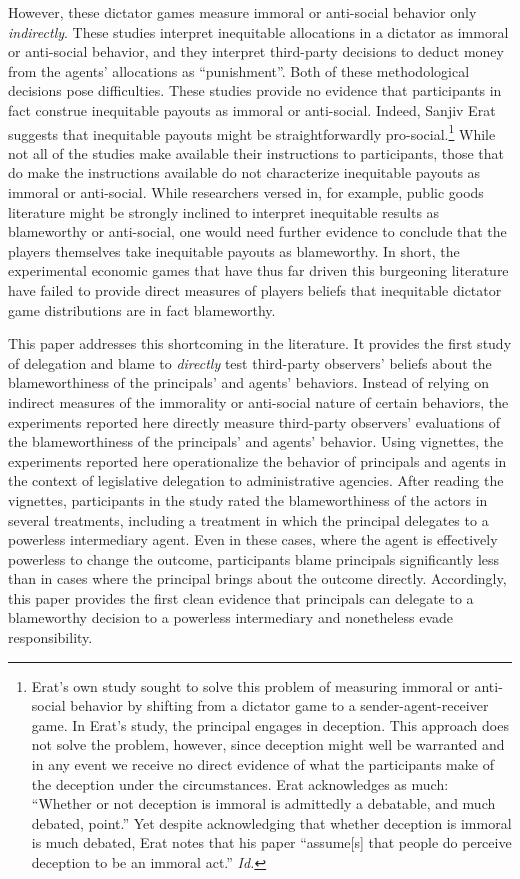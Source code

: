 \documentclass{article}
\begin{document}
However, these dictator games measure immoral or anti-social behavior only \emph{indirectly}. These studies interpret inequitable allocations in a dictator as immoral or anti-social behavior, and they interpret third-party decisions to deduct money from the agents' allocations as ``punishment''. \citep{Erat2013} Both of these methodological decisions pose difficulties. These studies provide no evidence that participants in fact construe inequitable payouts as immoral or anti-social. Indeed, Sanjiv Erat suggests that inequitable payouts might be straightforwardly pro-social.\footnote{Erat's own study sought to solve this problem of measuring immoral or anti-social behavior by shifting from a dictator game to a sender-agent-receiver game. In Erat's study, the principal engages in deception. This approach does not solve the problem, however, since deception might well be warranted and in any event we receive no direct evidence of what the participants make of the deception under the circumstances. Erat acknowledges as much: ``Whether or not deception is immoral is admittedly a debatable, and much debated, point.''\citep[p. 274]{Erat2013} Yet despite acknowledging that whether deception is immoral is much debated, Erat notes that his paper ``assume[s] that people do perceive deception to be an immoral act.'' \emph{Id.}} While not all of the studies make available their instructions to participants, those that do make the instructions available do not characterize inequitable payouts as immoral or anti-social. While researchers versed in, for example, public goods literature might be strongly inclined to interpret inequitable results as blameworthy or anti-social,\citep{Hamman2011} one would need further evidence to conclude that the players themselves take inequitable payouts as blameworthy.  In short, the experimental economic games that have thus far driven this burgeoning literature have failed to provide direct measures of players beliefs that inequitable dictator game distributions are in fact blameworthy. 

This paper addresses this shortcoming in the literature. It provides the first study of delegation and blame to \emph{directly} test third-party observers' beliefs about the blameworthiness of the principals' and agents' behaviors. Instead of relying on indirect measures of the immorality or anti-social nature of certain behaviors, the experiments reported here directly measure third-party observers' evaluations of the blameworthiness of the principals' and agents' behavior. Using vignettes, the experiments reported here operationalize the behavior of principals and agents in the context of legislative delegation to administrative agencies. After reading the vignettes, participants in the study rated the blameworthiness of the actors in several treatments, including a treatment in which the principal delegates to a powerless intermediary agent. Even in these cases, where the agent is effectively powerless to change the outcome, participants blame principals significantly less than in cases where the principal brings about the outcome directly. Accordingly, this paper provides the first clean evidence that principals can delegate to a blameworthy decision to a powerless intermediary and nonetheless evade responsibility.
\end{document}
